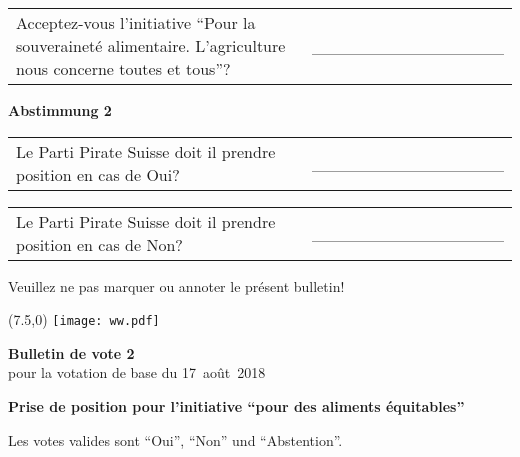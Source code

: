 \documentclass[11pt, a4paper]{scrartcl}
\begin{document}
{\begin{minipage}[t][12.5cm][t]{17.7cm}
\begin{tabular}{ b{13.5cm} b{3cm} }
Acceptez-vous l'initiative \enquote{Pour la souveraineté alimentaire. L’agriculture nous concerne toutes et tous}?
& \_\_\_\_\_\_\_\_\_\_\_\_\_\_\_\_ \\
\end{tabular}

\vspace{0.5cm}

\textbf{Abstimmung 2}

\vspace{0.5cm}

\begin{tabular}{ b{13.5cm} b{3cm} }
Le Parti Pirate Suisse doit il prendre position en cas de Oui?
& \_\_\_\_\_\_\_\_\_\_\_\_\_\_\_\_ \\
\end{tabular}

\vspace{0.5cm}

\begin{tabular}{ b{13.5cm} b{3cm} }
Le Parti Pirate Suisse doit il prendre position en cas de Non?
& \_\_\_\_\_\_\_\_\_\_\_\_\_\_\_\_ \\
\end{tabular}

\vspace{0.5cm}

Veuillez ne pas marquer ou annoter le présent bulletin!


\end{minipage}


\newpage

\begin{minipage}[t][12.5cm][t]{17.7cm}

\begin{textblock}{6}(7.5,0)
\texttt{[image: ww.pdf]}
\end{textblock}

{\LARGE\textbf{Bulletin de vote 2}} \\
pour la votation de base du 17~août~2018 \\

\vspace{2cm}

\textbf{Prise de position pour l'initiative \enquote{pour des aliments équitables}}

\vspace{0.1cm}
Les votes valides sont \enquote{Oui}, \enquote{Non} und \enquote{Abstention}.


\end{minipage}}
\end{document}
